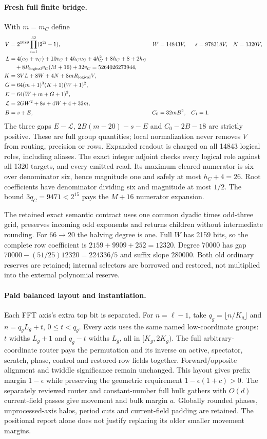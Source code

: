 \documentclass[11pt]{article}
\begin{document}
\paragraph{Fresh full finite bridge.}
With $m=m_C$ define
\begin{align*}
 V&=2^{1089}\prod_{i=1}^{32}(2^{2i}-1),&
 W&=14843V,&s&=978318V,&N&=1320V,\\
 L&=4(c_C+v_C)+10v_C+4h_Cv_C+4h_C^2+8h_C+8+2h_C\\
  &\quad+8R_{\rm logical}v_C(M+16)+32v_C=5264026273944,\\
 K&=3VL+8W+4N+8mR_{\rm logical}V,\\
 G&=64(m+1)^3(K+1)(W+1)^2,\\
 E&=64(W+m+G+1)^3,\\
 \mathcal L&=2GW^2+8s+4W+4+32m,\\
 B&=s+E,&C_0&=32mB^2,&C_1&=1.
\end{align*}
The three gaps $E-\mathcal L$, $2B(m-20)-s-E$ and
$C_0-2B-18$ are strictly positive. These are full group quantities;
local normalization never removes $V$ from routing, precision or rows.
Expanded readout is charged on all 14843 logical roles, including aliases.
The exact integer adjoint checks every logical role against all 1320 targets,
and every emitted read. Its maximum cleared numerator is six over denominator
six, hence magnitude one and safely at most $h_C+4=26$.
Root coefficients have denominator dividing six and magnitude at most $1/2$.
The bound $3q_C=9471<2^{15}$ pays the $M+16$ numerator expansion.

The retained exact semantic contract uses one common dyadic times
odd-three grid, preserves incoming odd exponents and returns children
without intermediate rounding. For $66\to20$ the halving degree is one.
Full $W$ has 2159 bits, so the complete row coefficient is
$2159+9909+252=12320$. Degree 70000 has gap
$70000-(51/25)12320=224336/5$ and suffix slope 280000.
Both old ordinary reserves are retained; internal selectors are borrowed
and restored, not multiplied into the external polynomial reserve.

\paragraph{Paid balanced layout and instantiation.}
Each FFT axis's extra top bit is separated. For $n=\ell-1$, take
$q_g=\lfloor n/K_g\rfloor$ and $n=q_gL_g+t$, $0\le t<q_g$.
Every axis uses the same named low-coordinate groups: $t$ widths
$L_g+1$ and $q_g-t$ widths $L_g$, all in $[K_g,2K_g)$.
The full arbitrary-coordinate router pays the permutation and its inverse
on active, spectator, scratch, phase, control and restored-row fields
together. Forward/opposite alignment and twiddle significance remain
unchanged. This layout gives prefix margin $1-\epsilon$ while preserving
the geometric requirement $1-\epsilon(1+c)>0$.
The separately reviewed router and constant-number full bulk gathers
with $O(d)$ current-field passes give movement and bulk margin $a$.
Globally rounded phases, unprocessed-axis halos, period cuts and
current-field padding are retained. The positional report alone does
not justify replacing its older smaller movement margins.
\end{document}
